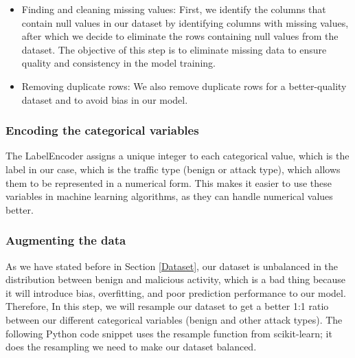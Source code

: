 \firmlist
\begin{itemize}
	\item Finding and cleaning missing values: First, we identify the columns that contain null values in our dataset by identifying columns with missing values, after which we decide to eliminate the rows containing null values from the dataset. The objective of this step is to eliminate missing data to ensure quality and consistency in the model training.
	
	\item Removing duplicate rows: We also remove duplicate rows for a better-quality dataset and to avoid bias in our model.
	
\end{itemize}






\subsubsection{Encoding the categorical variables}
The LabelEncoder assigns a unique integer to each categorical value, which is the label in our case, which is the traffic type (benign or attack type), which allows them to be represented in a numerical form. This makes it easier to use these variables in machine learning algorithms, as they can handle numerical values better.









\subsubsection{Augmenting the data}
As we have stated before in Section \ref{Dataset}, our dataset is unbalanced in the distribution between benign and malicious activity, which is a bad thing because it will introduce bias, overfitting, and poor prediction performance to our model. Therefore, In this step, we will resample our dataset to get a better 1:1 ratio between our different categorical variables (benign and other attack types). The following Python code snippet uses the resample function from scikit-learn; it does the resampling we need to make our dataset balanced.




